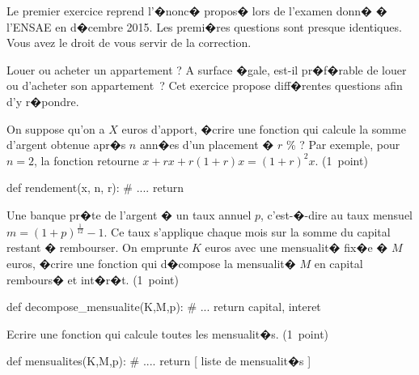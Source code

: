 %



Le premier exercice reprend l'�nonc� propos� lors de l'examen donn� � l'ENSAE en d�cembre 2015. Les premi�res questions sont presque identiques. Vous avez le droit de vous servir de la correction.

\exosubject{}
\begin{xexercice}\label{td_note_label1_2016}%


Louer ou acheter un appartement ? A surface �gale, est-il pr�f�rable de louer ou d'acheter son appartement~? Cet exercice propose diff�rentes questions afin d'y r�pondre.


\exequest On suppose qu'on a $X$ euros d'apport, �crire une fonction qui calcule la somme d'argent obtenue apr�s $n$ ann�es d'un placement � $r$ \% ? Par exemple, pour $n=2$, la fonction retourne $x + rx + r(1+r)x = (1+r)^2 x$. (1~point)

\begin{verbatimx}
def rendement(x, n, r):
    # ....
    return
\end{verbatimx}

\exequest Une banque pr�te de l'argent � un taux annuel $p$, c'est-�-dire au taux mensuel $m=(1+p)^\frac{1}{12}-1$. Ce taux s'applique chaque mois sur la somme du capital restant � rembourser. On emprunte $K$ euros avec une mensualit� fix�e � $M$ euros, �crire une fonction qui d�compose la mensualit� $M$ en capital rembours� et int�r�t. (1~point)

\begin{verbatimx}
def decompose_mensualite(K,M,p):
    # ...
    return capital, interet
\end{verbatimx}


\exequest Ecrire une fonction qui calcule toutes les mensualit�s. (1~point)

\begin{verbatimx}
def mensualites(K,M,p):
    # ....
    return [ liste de mensualit�s ]
\end{verbatimx}



\end{xexercice}
